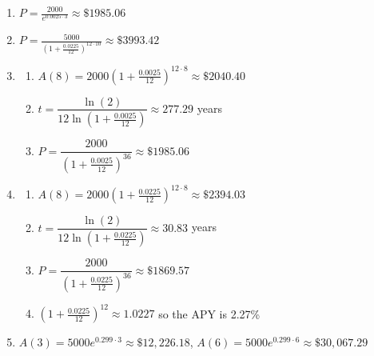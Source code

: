 \begin{enumerate}
\setcounter{enumi}{\value{HW}}

\addtocounter{enumi}{1}

\item  $P = \frac{2000}{e^{0.0025 \cdot 3}} \approx \$ 1985.06$

\item  $P = \frac{5000}{\left(1 + \frac{0.0225}{12}\right)^{12 \cdot 10}} \approx \$ 3993.42$

\item \begin{enumerate}

\item $A(8) = 2000\left(1 + \frac{0.0025}{12}\right)^{12 \cdot 8} \approx \$2040.40$
\item $t = \dfrac{\ln(2)}{12 \ln\left(1 + \frac{0.0025}{12}\right)} \approx 277.29$ years
\item $P = \dfrac{2000}{\left(1 + \frac{0.0025}{12}\right)^{36}} \approx \$1985.06$

\end{enumerate}

\item \begin{enumerate}

\item $A(8) = 2000\left(1 + \frac{0.0225}{12}\right)^{12 \cdot 8} \approx \$2394.03$
\item $t = \dfrac{\ln(2)}{12 \ln\left(1 + \frac{0.0225}{12}\right)} \approx 30.83$ years
\item $P = \dfrac{2000}{\left(1 + \frac{0.0225}{12}\right)^{36}} \approx \$1869.57$
\item $\left(1 + \frac{0.0225}{12}\right)^{12} \approx 1.0227$ so the APY is 2.27\%

\end{enumerate}

\item  $A(3) = 5000e^{0.299 \cdot 3} \approx \$12,226.18$,  $A(6) = 5000e^{0.299 \cdot 6} \approx \$30,067.29$

\setcounter{HW}{\value{enumi}}
\end{enumerate}


